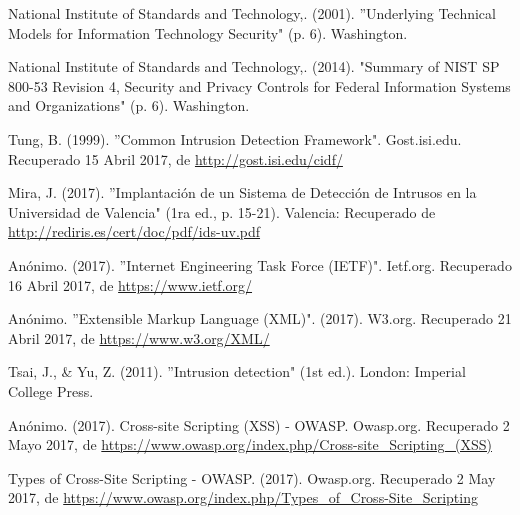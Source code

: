 \begin{thebibliography}{99}
 National Institute of Standards and Technology,. (2001). ''Underlying Technical Models for Information Technology Security" (p. 6). Washington.

 National Institute of Standards and Technology,. (2014). "Summary of NIST SP 800-53 Revision 4, Security and Privacy Controls for Federal Information Systems and Organizations" (p. 6). Washington.

 Tung, B. (1999). ''Common Intrusion Detection Framework". Gost.isi.edu. Recuperado 15 Abril 2017, de \url{http://gost.isi.edu/cidf/}

 Mira, J. (2017). ''Implantación de un Sistema de Detección de Intrusos en la Universidad de Valencia" (1ra ed., p. 15-21). Valencia: Recuperado de \url{http://rediris.es/cert/doc/pdf/ids-uv.pdf}

 Anónimo. (2017). ''Internet Engineering Task Force (IETF)". Ietf.org. Recuperado 16 Abril 2017, de \url{https://www.ietf.org/}

 Anónimo. ''Extensible Markup Language (XML)". (2017). W3.org. Recuperado 21 Abril 2017, de \url{https://www.w3.org/XML/}

 Tsai, J., \& Yu, Z. (2011). ''Intrusion detection" (1st ed.). London: Imperial College Press.

 Anónimo. (2017). Cross-site Scripting (XSS) - OWASP. Owasp.org. Recuperado 2 Mayo 2017, de \url{https://www.owasp.org/index.php/Cross-site_Scripting_(XSS)}

 Types of Cross-Site Scripting - OWASP. (2017). Owasp.org. Recuperado 2 May 2017, de \url{https://www.owasp.org/index.php/Types_of_Cross-Site_Scripting}

\end{thebibliography}
